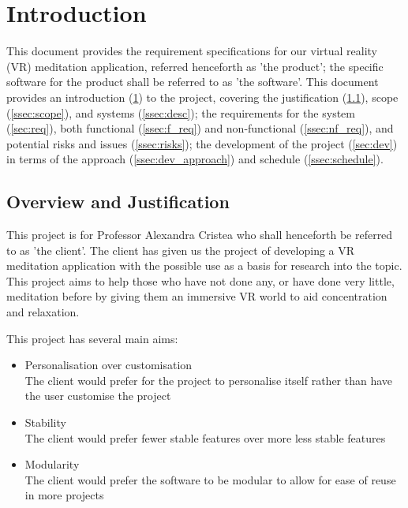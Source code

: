 \documentclass[coverpage]{../custom}
\begin{document}
\maketitle
\tableofcontents\newpage

\section{Introduction}
\label{sec:intro}

This document provides the requirement specifications for our virtual reality (VR) meditation application, referred henceforth as 'the product'; the specific software for the product shall be referred to as 'the software'. This document provides an introduction (\cref{sec:intro}) to the project, covering the justification (\cref{ssec:just}), scope (\cref{ssec:scope}), and systems (\cref{ssec:desc}); the requirements for the system (\cref{sec:req}), both functional (\cref{ssec:f_req}) and non-functional (\cref{ssec:nf_req}), and potential risks and issues (\cref{ssec:risks}); the development of the project (\cref{sec:dev}) in terms of the approach (\cref{ssec:dev_approach}) and schedule (\cref{ssec:schedule}).

\subsection{Overview and Justification}
\label{ssec:just}

This project is for Professor Alexandra Cristea who shall henceforth be referred to as 'the client'. The client has given us the project of developing a VR meditation application with the possible use as a basis for research into the topic. This project aims to help those who have not done any, or have done very little, meditation before by giving them an immersive VR world to aid concentration and relaxation.

This project has several main aims:
\begin{itemize}
	\item Personalisation over customisation\\
	The client would prefer for the project to personalise itself rather than have the user customise the project
	\item Stability\\
	The client would prefer fewer stable features over more less stable features
	\item Modularity\\
	The client would prefer the software to be modular to allow for ease of reuse in more projects
\end{itemize}
\end{document}
